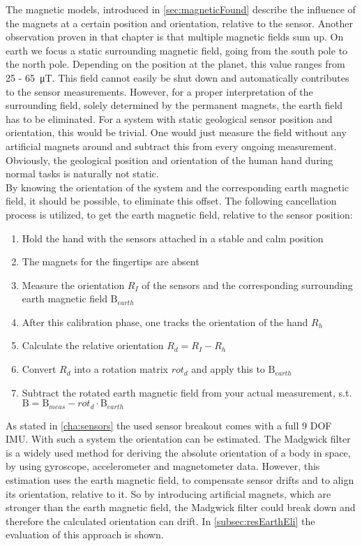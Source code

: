 The magnetic models, introduced in \ref{sec:magneticFound} describe the influence of the magnets at a certain position and orientation, relative to the sensor. Another observation proven in that chapter is that multiple magnetic fields sum up. On earth we focus a static surrounding magnetic field, going from the south pole to the north pole. Depending on the position at the planet, this value ranges from 25 - \SI{65}{\micro \tesla}. This field cannot easily be shut down and automatically contributes to the sensor measurements. However, for a proper interpretation of the surrounding field, solely determined by the permanent magnets, the earth field has to be eliminated. For a system with static geological sensor position and orientation, this would be trivial. One would just measure the field without any artificial magnets around and subtract this from every ongoing measurement. Obviously, the geological position and orientation of the human hand during normal tasks is naturally not static.\\
By knowing the orientation of the system and the corresponding earth magnetic field, it should be possible, to eliminate this offset. The following cancellation process is utilized, to get the earth magnetic field, relative to the sensor position:\\
\begin{enumerate}
\item Hold the hand with the sensors attached in a stable and calm position
\item The magnets for the fingertips are absent
\item Measure the orientation $ R_{I} $ of the sensors and the corresponding surrounding earth magnetic field $ \mathrm{B}_{earth} $
\item After this calibration phase, one tracks the orientation of the hand $ R_{h} $
\item Calculate the relative orientation $ R_{d} = R_{I} - R_{h} $
\item Convert $ R_{d} $ into a rotation matrix $ rot_{d} $ and apply this to $ \mathrm{B}_{earth} $
\item Subtract the rotated earth magnetic field from your actual measurement, s.t. \\ $ \mathrm{B} = \mathrm{B}_{meas} - rot_{d} \cdot \mathrm{B}_{earth} $
\end{enumerate}
As stated in \ref{cha:sensors} the used sensor breakout comes with a full 9 \ac{DOF} \ac{IMU}. With such a system the orientation can be estimated. The Madgwick filter \cite{madgwick2010efficient} is a widely used method for deriving the absolute orientation of a body in space, by using gyroscope, accelerometer and magnetometer data. However, this estimation uses the earth magnetic field, to compensate sensor drifts and to align its orientation, relative to it. So by introducing artificial magnets, which are stronger than the earth magnetic field, the Madgwick filter could break down and therefore the calculated orientation can drift. In \ref{subsec:resEarthEli} the evaluation of this approach is shown. 


